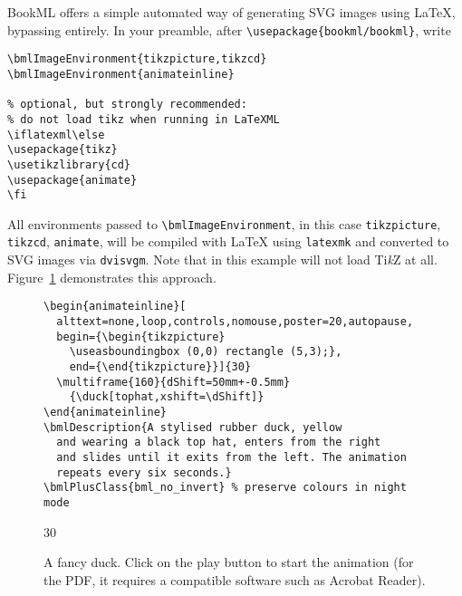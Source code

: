 \documentclass[a4paper,british]{article}
\def\tikzname{Ti\emph{k}Z}
\def\ltxinline{\lstinline[style=bookml]}
\begin{document}
BookML offers a simple automated way of generating SVG images using \LaTeX{}, bypassing \LaTeXML{} entirely. In your preamble, after \ltxinline|\usepackage{bookml/bookml}|, write
\begin{lstlisting}[style=bookml]
\bmlImageEnvironment{tikzpicture,tikzcd}
\bmlImageEnvironment{animateinline}

% optional, but strongly recommended:
% do not load tikz when running in LaTeXML
\iflatexml\else
\usepackage{tikz}
\usetikzlibrary{cd}
\usepackage{animate}
\fi
\end{lstlisting}

All environments passed to \ltxinline|\bmlImageEnvironment|, in this case \ltxinline|tikzpicture|, \ltxinline|tikzcd|, \ltxinline|animate|, will be compiled with \LaTeX{} using \lstinline[frame=none]|latexmk| and converted to SVG images via \lstinline[frame=none]|dvisvgm|. Note that in this example \LaTeXML{} will not load \tikzname{} at all. Figure~\ref{fig:duck} demonstrates this approach.

\begin{figure}
  \begin{lstlisting}[style=bookml]
\begin{animateinline}[
  alttext=none,loop,controls,nomouse,poster=20,autopause,
  begin={\begin{tikzpicture}
    \useasboundingbox (0,0) rectangle (5,3);},
    end={\end{tikzpicture}}]{30}
  \multiframe{160}{dShift=50mm+-0.5mm}
    {\duck[tophat,xshift=\dShift]}
\end{animateinline}
\bmlDescription{A stylised rubber duck, yellow
  and wearing a black top hat, enters from the right
  and slides until it exits from the left. The animation
  repeats every six seconds.}
\bmlPlusClass{bml_no_invert} % preserve colours in night mode
  \end{lstlisting}
  \begin{center}
    \begin{animateinline}[
      alttext=none,loop,controls,nomouse,poster=20,autopause,
      poster=20,autopause,
      begin={\begin{tikzpicture}%
        \useasboundingbox (0,0) rectangle (5,3);},
        end={\end{tikzpicture}}]{30}
        {\duck[tophat,xshift=\dShift]}
    \end{animateinline}
  \end{center}
  \caption{A fancy duck. Click on the play button to start the animation (for the PDF, it requires a compatible software such as Acrobat Reader).}
  \label{fig:duck}
\end{figure}
\end{document}
